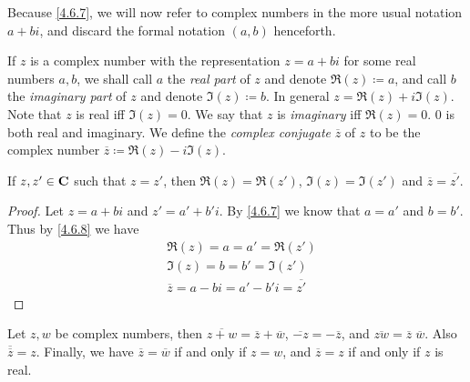 \begin{note}
  Because \cref{4.6.7}, we will now refer to complex numbers in the more usual notation \(a + bi\), and discard the formal notation \((a, b)\) henceforth.
\end{note}

\begin{definition}\label{4.6.8}
  If \(z\) is a complex number with the representation \(z = a + bi\) for some real numbers \(a, b\), we shall call \(a\) the \emph{real part} of \(z\) and denote \(\Re(z) \coloneqq a\), and call \(b\) the \emph{imaginary part} of \(z\) and denote \(\Im(z) \coloneqq b\).
  In general \(z = \Re(z) + i \Im(z)\).
  Note that \(z\) is real iff \(\Im(z) = 0\).
  We say that \(z\) is \emph{imaginary} iff \(\Re(z) = 0\).
  \(0\) is both real and imaginary.
  We define the \emph{complex conjugate} \(\overline{z}\) of \(z\) to be the complex number \(\overline{z} \coloneqq \Re(z) - i \Im(z)\).
\end{definition}

\begin{additional corollary}\label{ac 4.6.4}
If \(z, z' \in \mathbf{C}\) such that \(z = z'\), then \(\Re(z) = \Re(z')\), \(\Im(z) = \Im(z')\) and \(\overline{z} = \overline{z'}\).
\end{additional corollary}

\begin{proof}
  Let \(z = a + bi\) and \(z' = a' + b' i\).
  By \cref{4.6.7} we know that \(a = a'\) and \(b = b'\).
  Thus by \cref{4.6.8} we have
  \begin{align*}
     & \Re(z) = a = a' = \Re(z')                         \\
     & \Im(z) = b = b' = \Im(z')                         \\
     & \overline{z} = a - bi = a' - b' i = \overline{z'}
  \end{align*}
\end{proof}

\begin{lemma}\label{4.6.9}
  Let \(z, w\) be complex numbers, then \(\overline{z + w} = \overline{z} + \overline{w}\), \(\overline{-z} = -\overline{z}\), and \(\overline{zw} = \overline{z} \; \overline{w}\).
  Also \(\overline{\overline{z}} = z\).
  Finally, we have \(\overline{z} = \overline{w}\) if and only if \(z = w\), and \(\overline{z} = z\) if and only if \(z\) is real.
\end{lemma}

